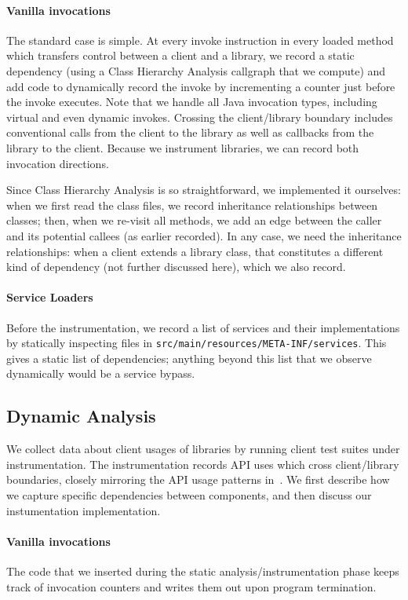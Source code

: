 \paragraph{Vanilla invocations}
The standard case is simple. At every invoke instruction in every
loaded method which transfers control between a client and a
library, we record a static dependency (using a Class Hierarchy
Analysis callgraph that we compute) and add code to dynamically record
the invoke by incrementing a counter just before the invoke
executes. Note that we handle all Java invocation types, including
virtual and even dynamic invokes. Crossing the client/library boundary
includes conventional calls from the client to the library as well as
callbacks from the library to the client.  Because we instrument
libraries, we can record both invocation directions.

Since Class Hierarchy Analysis is so straightforward, we implemented
it ourselves: when we first read the class files, we record
inheritance relationships between classes; then, when we re-visit all
methods, we add an edge between the caller and its potential callees
(as earlier recorded).  In any case, we need the inheritance
relationships: when a client extends a library class, that constitutes
a different kind of dependency (not further discussed here), which we also record.

\paragraph{Service Loaders} Before the instrumentation, we record a list 
of services and their implementations by statically inspecting files in \texttt{src/main/resources/META-INF/services}. This gives a static list of dependencies; anything beyond this list that we observe dynamically would be a service bypass.

\subsection{Dynamic Analysis}
\label{subsec:dynamic}
We collect data about client usages of libraries by running client
test suites under instrumentation. The instrumentation records API
uses which cross client/library boundaries, closely mirroring the API
usage patterns
in~\cite{venkatanarayanan22:_study_lever_api_usage_patter}. We first
describe how we capture specific dependencies between components, and
then discuss our instumentation implementation.

\paragraph{Vanilla invocations} The code that we inserted during the
static analysis/instrumentation phase keeps track of invocation counters
and writes them out upon program termination.

